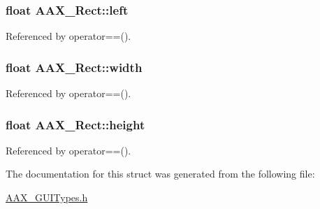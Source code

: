 \subsubsection[{left}]{\setlength{\rightskip}{0pt plus 5cm}float A\+A\+X\+\_\+\+Rect\+::left}\label{a00120_a1975750fe0b144a6c6bf5495006e8088}


Referenced by operator==().

\hypertarget{a00120_a0105870bc2c8d461b76f67c73b9832f5}{}
\subsubsection[{width}]{\setlength{\rightskip}{0pt plus 5cm}float A\+A\+X\+\_\+\+Rect\+::width}\label{a00120_a0105870bc2c8d461b76f67c73b9832f5}


Referenced by operator==().

\hypertarget{a00120_afee27da666682945c9cbfe2599f4ece4}{}
\subsubsection[{height}]{\setlength{\rightskip}{0pt plus 5cm}float A\+A\+X\+\_\+\+Rect\+::height}\label{a00120_afee27da666682945c9cbfe2599f4ece4}


Referenced by operator==().



The documentation for this struct was generated from the following file\+:\begin{DoxyCompactItemize}
\item 
\hyperlink{a00214}{A\+A\+X\+\_\+\+G\+U\+I\+Types.\+h}\end{DoxyCompactItemize}
